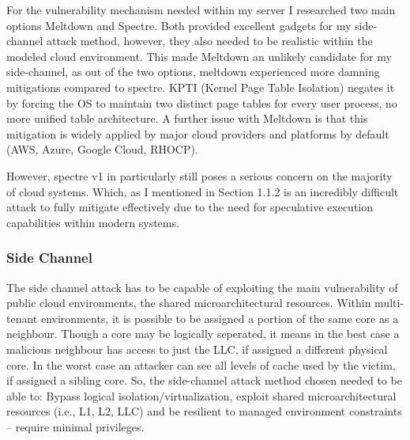 \documentclass[11pt,a4paper, notitlepage]{article}
\begin{document}
For the vulnerability mechanism needed within my server I researched two main options Meltdown and Spectre. Both provided excellent gadgets 
for my side-channel attack method, however, they also needed to be realistic within the modeled cloud environment. This made Meltdown an unlikely
candidate for my side-channel, as out of the two options, meltdown experienced more damning mitigations compared to spectre. KPTI (Kernel Page Table Isolation)
negates it by forcing the OS to maintain two distinct page tables for every user process, no more unified table architecture.
A further issue with Meltdown is that this mitigation is widely applied by major cloud providers and platforms by default (AWS, Azure, Google Cloud, RHOCP).

However, spectre v1 in particularly still poses a serious concern on the majority of cloud systems. Which, as I mentioned in Section 1.1.2 is an 
incredibly difficult attack to fully mitigate effectively due to the need for speculative execution capabilities within modern systems.
\subsubsection{Side Channel}
The side channel attack has to be capable of exploiting the main vulnerability of public cloud environments, the shared
microarchitectural resources. Within multi-tenant environments, it is possible to be assigned a portion of the same core as a neighbour. Though 
a core may be logically seperated, it means in the best case a malicious neighbour has access to just the LLC, if assigned a different physical core. In the worst case
an attacker can see all levels of cache used by the victim, if assigned a sibling core.
So, the side-channel attack method chosen needed to be able to: Bypass logical isolation/virtualization, exploit shared microarchitectural resources (i.e., L1, L2, LLC) and 
be resilient to managed environment constraints -- require minimal privileges.
\end{document}
